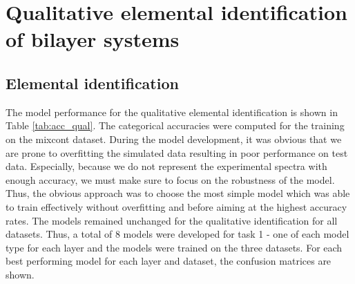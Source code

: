 \section{Qualitative elemental identification of bilayer systems}
\subsection{Elemental identification}
The model performance for the qualitative elemental identification is shown in Table \ref{tab:acc_qual}. The categorical accuracies were computed for the training on the mixcont dataset. 
During the model development, it was obvious that we are prone to overfitting the simulated data resulting in poor performance on test data. Especially, because we do not represent the experimental spectra with enough accuracy, we must make sure to focus on the robustness of the model. Thus, the obvious approach was to choose the most simple model which was able to train effectively without overfitting and before aiming at the highest accuracy rates. The models remained unchanged for the qualitative identification for all datasets. Thus, a total of 8 models were developed for task 1 - one of each model type for each layer and the models were trained on the three datasets. For each best performing model for each layer and dataset, the confusion matrices are shown.

